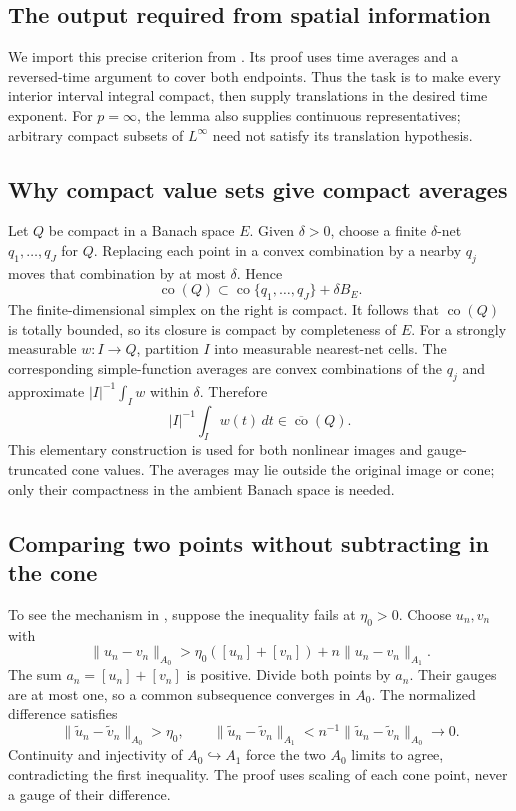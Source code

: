 \documentclass[12pt,reqno]{amsart}
\begin{document}
\subsection{The output required from spatial information}
\begin{lemma}[Simon]\label{lem:criterion}

\end{lemma}
We import this precise criterion from \cite[Theorem 1, pp.~71--73]{S-simon}. Its proof uses time averages and a reversed-time argument to cover both endpoints. Thus the task is to make every interior interval integral compact, then supply translations in the desired time exponent. For $p=\infty$, the lemma also supplies continuous representatives; arbitrary compact subsets of $L^\infty$ need not satisfy its translation hypothesis.
\subsection{Why compact value sets give compact averages}
Let $Q$ be compact in a Banach space $E$. Given $\delta>0$, choose a finite $\delta$-net $q_1,\ldots,q_J$ for $Q$. Replacing each point in a convex combination by a nearby $q_j$ moves that combination by at most $\delta$. Hence
\[
\operatorname{co}(Q)\subset \operatorname{co}\{q_1,\ldots,q_J\}+\delta B_E.
\]
The finite-dimensional simplex on the right is compact. It follows that $\operatorname{co}(Q)$ is totally bounded, so its closure is compact by completeness of $E$.
For a strongly measurable $w:I\to Q$, partition $I$ into measurable nearest-net cells. The corresponding simple-function averages are convex combinations of the $q_j$ and approximate $|I|^{-1}\int_Iw$ within $\delta$. Therefore
\[
|I|^{-1}\int_I w(t)\,dt\in\overline{\operatorname{co}}(Q).
\]
This elementary construction is used for both nonlinear images and gauge-truncated cone values. The averages may lie outside the original image or cone; only their compactness in the ambient Banach space is needed.
\subsection{Comparing two points without subtracting in the cone}
\begin{lemma}\label{lem:ehrling}

\end{lemma}
To see the mechanism in \cite[Lemma 1, pp.~4--5]{S-barrett-suli}, suppose the inequality fails at $\eta_0>0$. Choose $u_n,v_n$ with
\[
\|u_n-v_n\|_{A_0}>\eta_0([u_n]+[v_n])+n\|u_n-v_n\|_{A_1}.
\]
The sum $a_n=[u_n]+[v_n]$ is positive. Divide both points by $a_n$. Their gauges are at most one, so a common subsequence converges in $A_0$. The normalized difference satisfies
\[
\|\widetilde u_n-\widetilde v_n\|_{A_0}>\eta_0,
\qquad
\|\widetilde u_n-\widetilde v_n\|_{A_1}
< n^{-1}\|\widetilde u_n-\widetilde v_n\|_{A_0}\longrightarrow0.
\]
Continuity and injectivity of $A_0\hookrightarrow A_1$ force the two $A_0$ limits to agree, contradicting the first inequality. The proof uses scaling of each cone point, never a gauge of their difference.
\end{document}
